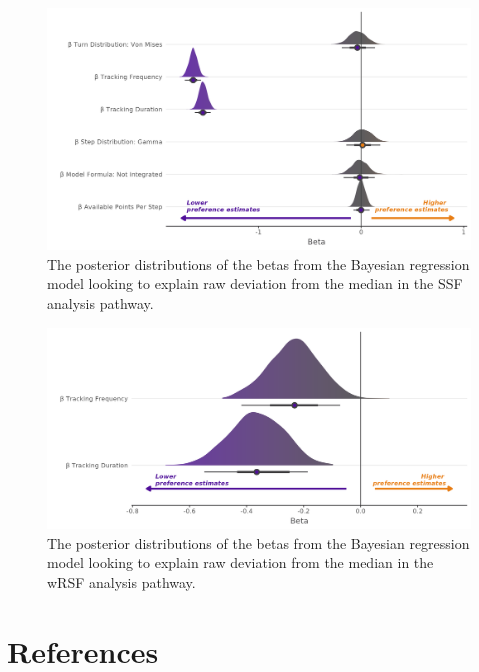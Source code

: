 \documentclass[10pt,a4paper]{article}
\begin{document}
\begin{figure}
\includegraphics[width=1\linewidth]{../figures/ssf_rEstSSF_effectsPlot} \caption{The posterior distributions of the betas from the Bayesian regression model looking to explain raw deviation from the median in the SSF analysis pathway.}\label{fig:rEstBetasSSF}
\end{figure}

\begin{figure}
\includegraphics[width=1\linewidth]{../figures/wrsf_rEstwrsf_effectsPlot} \caption{The posterior distributions of the betas from the Bayesian regression model looking to explain raw deviation from the median in the wRSF analysis pathway.}\label{fig:rEstBetasWRSF}
\end{figure}
\clearpage

\hypertarget{references}{%
\section*{References}\label{references}}
\end{document}
